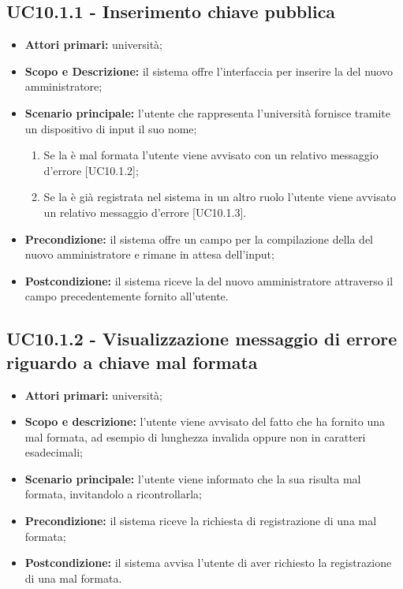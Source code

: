 \documentclass[AnalisiDeiRequisiti.tex]{subfiles}
\begin{document}
\subsection{UC10.1.1 - Inserimento chiave pubblica}
\begin{itemize}
	\item \textbf{Attori primari:} università;
	\item \textbf{Scopo e Descrizione:} il sistema offre l'interfaccia per inserire la  del nuovo amministratore;
	\item \textbf{Scenario principale:} l'utente che rappresenta l'università fornisce tramite un dispositivo di input il suo nome;	\begin{enumerate}
		\item Se la  è mal formata l'utente viene avvisato con un relativo messaggio d'errore [UC10.1.2];
		\item Se la  è già registrata nel sistema in un altro ruolo l'utente viene avvisato un relativo messaggio d'errore [UC10.1.3].
	\end{enumerate}
	\item \textbf{Precondizione:} il sistema offre un campo per la compilazione della  del nuovo amministratore e rimane in attesa dell'input;
	\item \textbf{Postcondizione:} il sistema riceve la  del nuovo amministratore attraverso il campo precedentemente fornito all'utente.
\end{itemize}
\subsection{UC10.1.2 - Visualizzazione messaggio di errore riguardo a chiave mal formata}
\begin{itemize}
	\item \textbf{Attori primari:} università;
	\item \textbf{Scopo e descrizione:} l'utente viene avvisato del fatto che ha fornito una  mal formata, ad esempio di lunghezza invalida oppure non in caratteri esadecimali;
	\item \textbf{Scenario principale:} l'utente viene informato che la sua  risulta mal formata, invitandolo a ricontrollarla;
	\item \textbf{Precondizione:} il sistema riceve la richiesta di registrazione di una  mal formata;
	\item \textbf{Postcondizione:} il sistema avvisa l'utente di aver richiesto la registrazione di una  mal formata.
\end{itemize}
\end{document}
